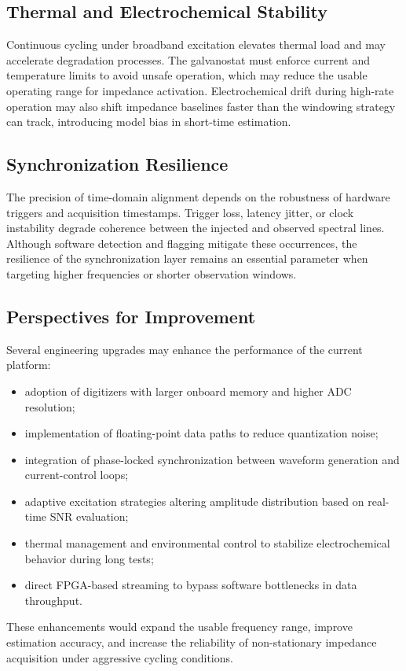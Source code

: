 \subsection{Thermal and Electrochemical Stability}

Continuous cycling under broadband excitation elevates thermal load and may accelerate degradation processes. The galvanostat must enforce current and temperature limits to avoid unsafe operation, which may reduce the usable operating range for impedance activation. Electrochemical drift during high-rate operation may also shift impedance baselines faster than the windowing strategy can track, introducing model bias in short-time estimation.

\subsection{Synchronization Resilience}

The precision of time-domain alignment depends on the robustness of hardware triggers and acquisition timestamps. Trigger loss, latency jitter, or clock instability degrade coherence between the injected and observed spectral lines. Although software detection and flagging mitigate these occurrences, the resilience of the synchronization layer remains an essential parameter when targeting higher frequencies or shorter observation windows.

\subsection{Perspectives for Improvement}

Several engineering upgrades may enhance the performance of the current platform:
\begin{itemize}
    \item adoption of digitizers with larger onboard memory and higher ADC resolution;
    \item implementation of floating-point data paths to reduce quantization noise;
    \item integration of phase-locked synchronization between waveform generation and current-control loops;
    \item adaptive excitation strategies altering amplitude distribution based on real-time SNR evaluation;
    \item thermal management and environmental control to stabilize electrochemical behavior during long tests;
    \item direct FPGA-based streaming to bypass software bottlenecks in data throughput.
\end{itemize}
These enhancements would expand the usable frequency range, improve estimation accuracy, and increase the reliability of non-stationary impedance acquisition under aggressive cycling conditions.

